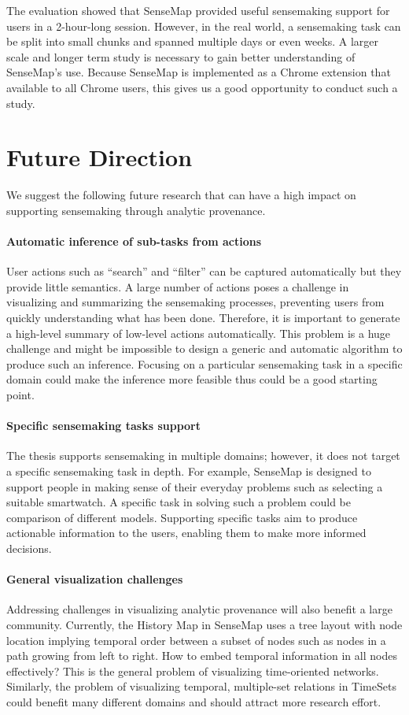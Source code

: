 The evaluation showed that SenseMap provided useful sensemaking support for users in a 2-hour-long session. However, in the real world, a sensemaking task can be split into small chunks and spanned multiple days or even weeks. A larger scale and longer term study is necessary to gain better understanding of SenseMap's use. Because SenseMap is implemented as a Chrome extension that available to all Chrome users, this gives us a good opportunity to conduct such a study.

\section{Future Direction}
We suggest the following future research that can have a high impact on supporting sensemaking through analytic provenance.

\paragraph{Automatic inference of sub-tasks from actions}
User actions such as ``search'' and ``filter'' can be captured automatically but they provide little semantics. A large number of actions poses a challenge in visualizing and summarizing the sensemaking processes, preventing users from quickly understanding what has been done. Therefore, it is important to generate a high-level summary of low-level actions automatically. This problem is a huge challenge and might be impossible to design a generic and automatic algorithm to produce such an inference. Focusing on a particular sensemaking task in a specific domain could make the inference more feasible thus could be a good starting point.

\paragraph{Specific sensemaking tasks support}
The thesis supports sensemaking in multiple domains; however, it does not target a specific sensemaking task in depth. For example, SenseMap is designed to support people in making sense of their everyday problems such as selecting a suitable smartwatch. A specific task in solving such a problem could be comparison of different models. Supporting specific tasks aim to produce actionable information to the users, enabling them to make more informed decisions.

\paragraph{General visualization challenges}
Addressing challenges in visualizing analytic provenance will also benefit a large community. Currently, the History Map in SenseMap uses a tree layout with node location implying temporal order between a subset of nodes such as nodes in a path growing from left to right. How to embed temporal information in all nodes effectively? This is the general problem of visualizing time-oriented networks. Similarly, the problem of visualizing temporal, multiple-set relations in TimeSets could benefit many different domains and should attract more research effort.

